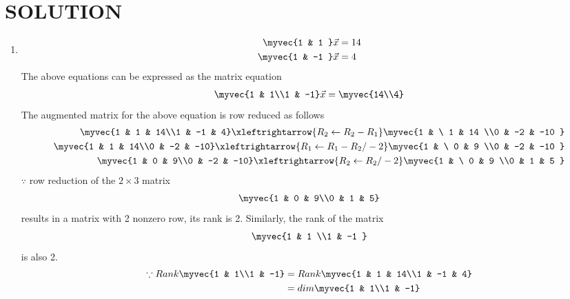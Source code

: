 \documentclass[journal,12pt,twocolumn]{IEEEtran}
\begin{document}
\section{SOLUTION}  
\begin{enumerate}
\item
\begin{align}
\begin{split}
\myvec{1 & 1 }\vec{x}&=14
\\
\myvec{1 & -1 }\vec{x}&=4
\end{split}
\end{align}
The above equations can be expressed as the matrix equation
\begin{align}
\myvec{1 & 1\\1 & -1} \vec{x} = \myvec{14\\4}
\end{align}
%
The augmented matrix for the above equation is row reduced as follows
\begin{align}
\myvec{1 & 1 & 14\\1 & -1 & 4} 
\xleftrightarrow {R_2\leftarrow R_2 -R_1}\myvec{1 & \ 1 & 14 \\0 & -2 & -10 }
\\
\myvec{1 & 1 & 14\\0 & -2 & -10} 
\xleftrightarrow {R_1\leftarrow R_1 -R_2/-2}\myvec{1 & \ 0 & 9 \\0 & -2 & -10 }
\\
\myvec{1 & 0 & 9\\0 & -2 & -10} 
\xleftrightarrow {R_2\leftarrow R_2/-2}\myvec{1 & \ 0 & 9 \\0 & 1 & 5 }
\end{align}
%
$\because$ row reduction of the $2\times 3$ matrix
%
\begin{align}
\myvec{1 & 0 & 9\\0 & 1 & 5} 
\end{align}
%
results in a matrix with 2 nonzero row, its rank is 2. 
%
Similarly, the rank of the matrix 
\begin{align}
\myvec{1 & 1 \\1 & -1 } 
\end{align}
%
is also 2.
%
\begin{align}
\because Rank \myvec{1 & 1\\1 & -1} &= Rank\myvec{1 & 1 & 14\\1 & -1 & 4} \nonumber\\
 &=dim \myvec{1 & 1\\1 & -1}\nonumber\\

\end{align}
\end{enumerate}
\end{document}

